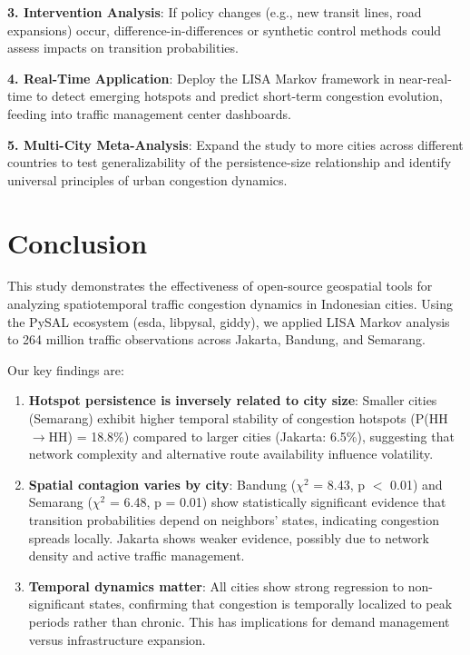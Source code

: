 \documentclass[11pt,a4paper]{article}
\begin{document}
\textbf{3. Intervention Analysis}: If policy changes (e.g., new transit lines, road expansions) occur, difference-in-differences or synthetic control methods could assess impacts on transition probabilities.

\textbf{4. Real-Time Application}: Deploy the LISA Markov framework in near-real-time to detect emerging hotspots and predict short-term congestion evolution, feeding into traffic management center dashboards.

\textbf{5. Multi-City Meta-Analysis}: Expand the study to more cities across different countries to test generalizability of the persistence-size relationship and identify universal principles of urban congestion dynamics.

\section{Conclusion}

This study demonstrates the effectiveness of open-source geospatial tools for analyzing spatiotemporal traffic congestion dynamics in Indonesian cities. Using the PySAL ecosystem (esda, libpysal, giddy), we applied LISA Markov analysis to 264 million traffic observations across Jakarta, Bandung, and Semarang.

Our key findings are:

\begin{enumerate}
    \item \textbf{Hotspot persistence is inversely related to city size}: Smaller cities (Semarang) exhibit higher temporal stability of congestion hotspots (P(HH$\rightarrow$HH) = 18.8\%) compared to larger cities (Jakarta: 6.5\%), suggesting that network complexity and alternative route availability influence volatility.
    
    \item \textbf{Spatial contagion varies by city}: Bandung ($\chi^2$ = 8.43, p $<$ 0.01) and Semarang ($\chi^2$ = 6.48, p = 0.01) show statistically significant evidence that transition probabilities depend on neighbors' states, indicating congestion spreads locally. Jakarta shows weaker evidence, possibly due to network density and active traffic management.
    
    \item \textbf{Temporal dynamics matter}: All cities show strong regression to non-significant states, confirming that congestion is temporally localized to peak periods rather than chronic. This has implications for demand management versus infrastructure expansion.
\end{enumerate}
\end{document}
